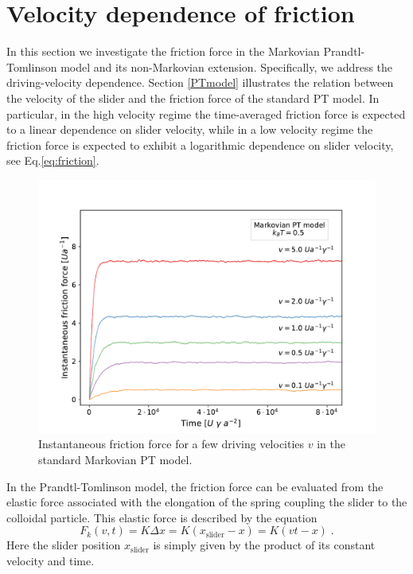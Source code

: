 \section{Velocity dependence of friction}
In this section we investigate the friction force in the Markovian Prandtl-Tomlinson model and its non-Markovian extension. Specifically, we address the driving-velocity dependence. Section \ref{PTmodel} illustrates the relation between the velocity of the slider and the friction force of the standard PT model. In particular, in the high velocity regime the time-averaged friction force is expected to a linear dependence on slider velocity, while in a low velocity regime the friction force is expected to exhibit a logarithmic dependence on slider velocity, see Eq.\eqref{eq:friction}.
\begin{figure}
    \centering
    \includegraphics[width=\textwidth]{alteV_kb0_forzaplot.pdf}
    \caption{Instantaneous friction force for a few driving velocities $v$ in the standard Markovian PT model.}
    \label{fig:friction_kb0_high_velocities}
\end{figure}
In the Prandtl-Tomlinson model, the friction force can be evaluated from the elastic force associated with the elongation of the spring coupling the slider to the colloidal particle. This elastic force is described by the equation
\begin{equation}
    F_k(v,t) = K\Delta x = K (x_\text{slider} - x) = K(vt -  x)\; .
\end{equation}
Here the slider position $x_\text{slider}$ is simply given by the product of its constant velocity and time.

